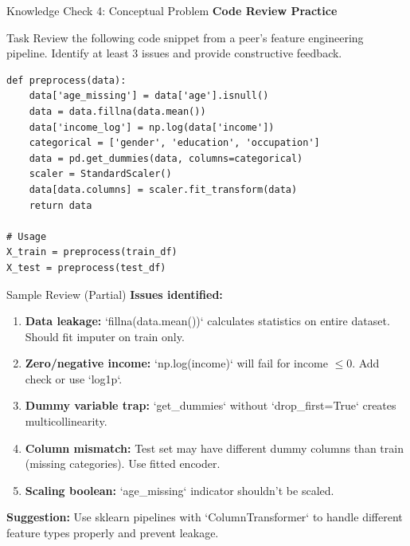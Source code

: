 \begin{frame}{Knowledge Check 4: Conceptual Problem}
\textbf{Code Review Practice}

\vspace{0.3cm}

\begin{block}{Task}
Review the following code snippet from a peer's feature engineering pipeline. Identify at least 3 issues and provide constructive feedback.

\small
\begin{verbatim}
def preprocess(data):
    data['age_missing'] = data['age'].isnull()
    data = data.fillna(data.mean())
    data['income_log'] = np.log(data['income'])
    categorical = ['gender', 'education', 'occupation']
    data = pd.get_dummies(data, columns=categorical)
    scaler = StandardScaler()
    data[data.columns] = scaler.fit_transform(data)
    return data

# Usage
X_train = preprocess(train_df)
X_test = preprocess(test_df)
\end{verbatim}
\end{block}

\pause

\begin{block}{Sample Review (Partial)}
\small
\textbf{Issues identified:}
\begin{enumerate}
\item \textbf{Data leakage:} `fillna(data.mean())` calculates statistics on entire dataset. Should fit imputer on train only.
\item \textbf{Zero/negative income:} `np.log(income)` will fail for income $\leq 0$. Add check or use `log1p`.
\item \textbf{Dummy variable trap:} `get_dummies` without `drop_first=True` creates multicollinearity.
\item \textbf{Column mismatch:} Test set may have different dummy columns than train (missing categories). Use fitted encoder.
\item \textbf{Scaling boolean:} `age_missing` indicator shouldn't be scaled.
\end{enumerate}

\textbf{Suggestion:} Use sklearn pipelines with `ColumnTransformer` to handle different feature types properly and prevent leakage.
\end{block}
\end{frame}


